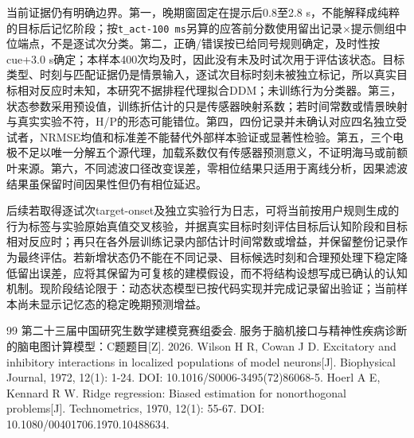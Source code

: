当前证据仍有明确边界。第一，晚期窗固定在提示后0.8至2.8 s，不能解释成纯粹的目标后记忆阶段；按\texttt{t\_act-100\ ms}另算的应答前分数使用留出记录×提示侧组中位端点，不是逐试次分类。第二，正确/错误按已给同号规则确定，及时性按cue+3.0 s确定；本样本400次均及时，因此没有未及时试次用于评估该状态。目标类型、时刻与匹配证据仍是情景输入，逐试次目标时刻未被独立标记，所以真实目标相对反应时未知，本研究不据排程代理拟合DDM；未训练行为分类器。第三，状态参数采用预设值，训练折估计的只是传感器映射系数；若时间常数或情景映射与真实实验不符，H/P的形态可能错位。第四，四份记录并未确认对应四名独立受试者，NRMSE均值和标准差不能替代外部样本验证或显著性检验。第五，三个电极不足以唯一分解五个源代理，加载系数仅有传感器预测意义，不证明海马或前额叶来源。第六，不同滤波口径改变误差，零相位结果只适用于离线分析，因果滤波结果虽保留时间因果性但仍有相位延迟。

后续若取得逐试次target-onset及独立实验行为日志，可将当前按用户规则生成的行为标签与实验原始真值交叉核验，并据真实目标时刻评估目标后认知阶段和目标相对反应时；再只在各外层训练记录内部估计时间常数或增益，并保留整份记录作为最终评估。若新增状态仍不能在不同记录、目标候选时刻和合理预处理下稳定降低留出误差，应将其保留为可复核的建模假设，而不将结构设想写成已确认的认知机制。现阶段结论限于：动态状态模型已按代码实现并完成记录留出验证；当前样本尚未显示记忆态的稳定晚期预测增益。

\clearpage
{}

\begin{thebibliography}{99}
\setlength{\itemsep}{2pt}
 第二十三届中国研究生数学建模竞赛组委会. 服务于脑机接口与精神性疾病诊断的脑电图计算模型：C题题目[Z]. 2026.
 Wilson H R, Cowan J D. Excitatory and inhibitory interactions in localized populations of model neurons[J]. Biophysical Journal, 1972, 12(1): 1-24. DOI: 10.1016/S0006-3495(72)86068-5.
 Hoerl A E, Kennard R W. Ridge regression: Biased estimation for nonorthogonal problems[J]. Technometrics, 1970, 12(1): 55-67. DOI: 10.1080/00401706.1970.10488634.
\end{thebibliography}
